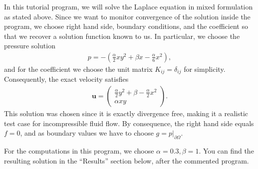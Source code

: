 \documentclass{article}
\renewcommand{\vec}[1]{\mathbf{#1}}
\begin{document}
In this tutorial program, we will solve the Laplace equation in mixed
formulation as stated above. Since we want to monitor convergence of the
solution inside the program, we choose right hand side, boundary conditions,
and the coefficient so that we recover a solution function known to us. In
particular, we choose the pressure solution
\begin{align*}
  p = -\left(\frac \alpha 2 xy^2 + \beta x - \frac \alpha 6 x^2\right),
\end{align*}
and for the coefficient we choose the unit matrix $K_{ij}=\delta_{ij}$ for
simplicity. Consequently, the exact velocity satisfies
\begin{align*}
  \vec u = 
  \begin{pmatrix}
    \frac \alpha 2 y^2 + \beta - \frac \alpha 2 x^2 \\
    \alpha xy
  \end{pmatrix}.
\end{align*}
This solution was chosen since it is exactly divergence free, making it a
realistic test case for incompressible fluid flow. By consequence, the right
hand side equals $f=0$, and as boundary values we have to choose
$g=p|_{\partial\Omega}$.

For the computations in this program, we choose $\alpha=0.3,\beta=1$. You can
find the resulting solution in the ``Results'' section below, after the
commented program.
\end{document}
